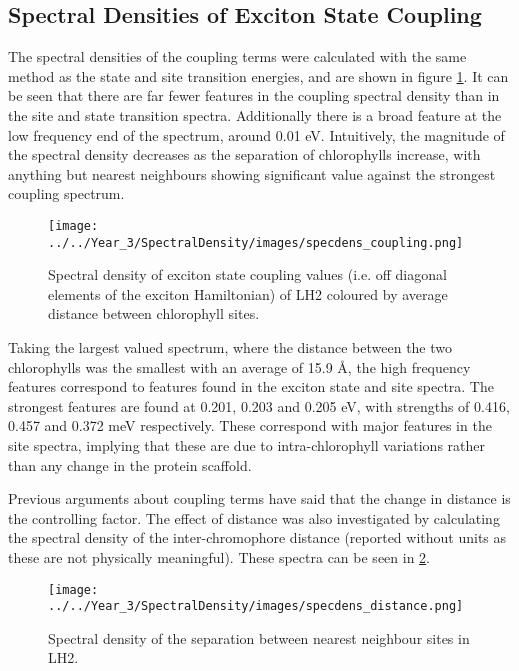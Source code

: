 \afterpartskip
\subsection{Spectral Densities of Exciton State Coupling}
\label{subcsec:coupling}

The spectral densities of the coupling terms were calculated with the same method
as the state and site transition energies, and are shown in figure \ref{fig:specdens_coupling}.
It can be seen that there are far fewer features in the coupling spectral density
than in the site and state transition spectra. Additionally there is a broad feature
at the low frequency end of the spectrum, around 0.01 eV. Intuitively, the magnitude
of the spectral density decreases as the separation of chlorophylls increase, with
anything but nearest neighbours showing significant value against the strongest coupling 
spectrum.

\begin{figure}
    \centering
    \texttt{[image: ../../Year\_3/SpectralDensity/images/specdens\_coupling.png]}
    \caption{Spectral density of exciton state coupling values (i.e. off diagonal
    elements of the exciton Hamiltonian) of LH2 coloured by average distance between 
    chlorophyll sites.}
    \label{fig:specdens_coupling}
\end{figure}


Taking the largest valued spectrum, where the distance between the two chlorophylls
was the smallest with an average of 15.9 \AA{}, the high frequency features correspond 
to features found in the exciton state and site spectra. The strongest features are 
found at 0.201, 0.203 and 0.205 eV, with strengths of 0.416, 0.457 and 0.372 meV 
respectively. These correspond with major features in the site spectra, implying 
that these are due to intra-chlorophyll variations rather than any change in the
protein scaffold.

Previous arguments about coupling terms have said that the change in distance is
the controlling factor. The effect of distance was also investigated by calculating
the spectral density of the inter-chromophore distance (reported without units as 
these are not physically meaningful). These spectra can be seen in \ref{fig:specdens_distance}. 

\begin{figure}
    \centering
    \texttt{[image: ../../Year\_3/SpectralDensity/images/specdens\_distance.png]}
    \caption{Spectral density of the separation between nearest neighbour sites
    in LH2.}
    \label{fig:specdens_distance}
\end{figure}

